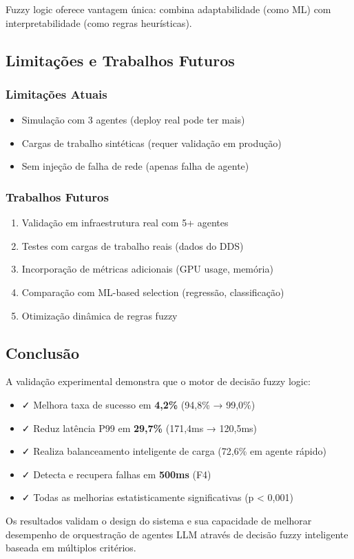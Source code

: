 Fuzzy logic oferece vantagem única: combina adaptabilidade (como ML) com interpretabilidade (como regras heurísticas).

\subsection{Limitações e Trabalhos Futuros}

\subsubsection{Limitações Atuais}

\begin{itemize}
  \item Simulação com 3 agentes (deploy real pode ter mais)
  \item Cargas de trabalho sintéticas (requer validação em produção)
  \item Sem injeção de falha de rede (apenas falha de agente)
\end{itemize}

\subsubsection{Trabalhos Futuros}

\begin{enumerate}
  \item Validação em infraestrutura real com 5+ agentes
  \item Testes com cargas de trabalho reais (dados do DDS)
  \item Incorporação de métricas adicionais (GPU usage, memória)
  \item Comparação com ML-based selection (regressão, classificação)
  \item Otimização dinâmica de regras fuzzy
\end{enumerate}

\subsection{Conclusão}

A validação experimental demonstra que o motor de decisão fuzzy logic:

\begin{itemize}
  \item ✓ Melhora taxa de sucesso em \textbf{4,2\%} (94,8\% → 99,0\%)
  \item ✓ Reduz latência P99 em \textbf{29,7\%} (171,4ms → 120,5ms)
  \item ✓ Realiza balanceamento inteligente de carga (72,6\% em agente rápido)
  \item ✓ Detecta e recupera falhas em \textbf{500ms} (F4)
  \item ✓ Todas as melhorias estatisticamente significativas (p < 0,001)
\end{itemize}

Os resultados validam o design do sistema e sua capacidade de melhorar desempenho de orquestração de agentes LLM através de decisão fuzzy inteligente baseada em múltiplos critérios.

